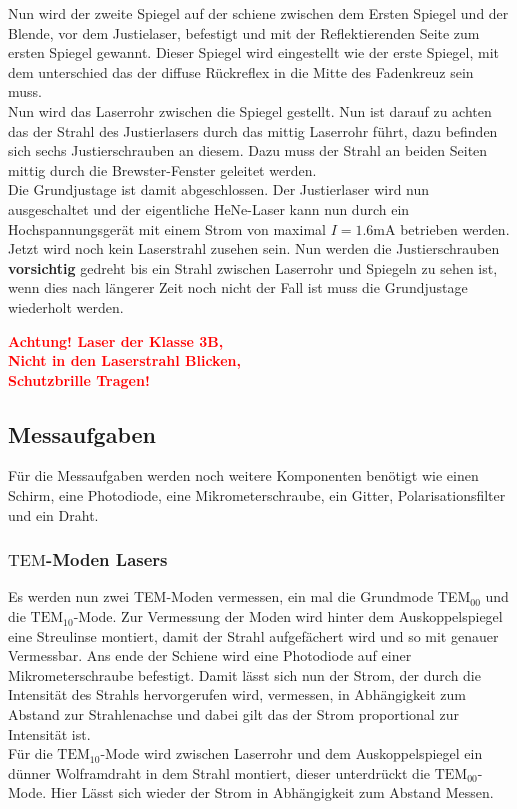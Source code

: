 Nun wird der zweite Spiegel auf der schiene zwischen dem Ersten Spiegel und der Blende, vor dem Justielaser, befestigt und mit der Reflektierenden Seite zum ersten Spiegel gewannt. Dieser Spiegel wird eingestellt wie der erste Spiegel, mit dem unterschied das der diffuse Rückreflex in die Mitte des Fadenkreuz sein muss.\\
Nun wird das Laserrohr zwischen die Spiegel gestellt. Nun ist darauf zu achten das der Strahl des Justierlasers durch das mittig Laserrohr führt, dazu befinden sich sechs Justierschrauben an diesem. Dazu muss der Strahl an beiden Seiten mittig durch die Brewster-Fenster geleitet werden.\\
Die Grundjustage ist damit abgeschlossen. Der Justierlaser wird nun ausgeschaltet und der eigentliche HeNe-Laser kann nun durch ein Hochspannungsgerät mit einem Strom von maximal $I=1.6$mA betrieben werden. Jetzt wird noch kein Laserstrahl zusehen sein. Nun werden die Justierschrauben \textbf{vorsichtig} gedreht bis ein Strahl zwischen Laserrohr und Spiegeln zu sehen ist, wenn dies nach längerer Zeit noch nicht der Fall ist muss die Grundjustage wiederholt werden.\\
\begin{center}
\textbf{\textcolor{red}{Achtung! Laser der Klasse 3B,}\centering}\\ 
\textbf{\textcolor{red}{Nicht in den Laserstrahl Blicken,}\centering}\\
\textbf{\textcolor{red}{Schutzbrille Tragen!}\centering}
\end{center}

\subsection{Messaufgaben}
Für die Messaufgaben werden noch weitere Komponenten benötigt wie einen Schirm, eine Photodiode, eine Mikrometerschraube, ein Gitter, Polarisationsfilter und ein Draht.
\subsubsection{$\mathrm{TEM}$-Moden Lasers}
Es werden nun zwei TEM-Moden vermessen, ein mal die Grundmode TEM${}_{00}$ und die $\mathrm{TEM}_{10}$-Mode. Zur Vermessung der Moden wird hinter dem Auskoppelspiegel eine Streulinse montiert, damit der Strahl aufgefächert wird und so mit genauer Vermessbar. Ans ende der Schiene wird eine Photodiode auf einer Mikrometerschraube befestigt. Damit lässt sich nun der Strom, der durch die Intensität des Strahls hervorgerufen wird, vermessen, in Abhängigkeit zum Abstand zur Strahlenachse und dabei gilt das der Strom proportional zur Intensität ist. \\
Für die $\mathrm{TEM}_{10}$-Mode wird zwischen Laserrohr und dem Auskoppelspiegel ein dünner Wolframdraht in dem Strahl montiert, dieser unterdrückt die $\mathrm{TEM}_{00}$-Mode. Hier Lässt sich wieder der Strom in Abhängigkeit zum Abstand Messen.
